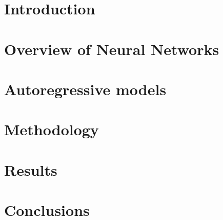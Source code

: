 \documentclass{thesis}
\begin{document}
\maketitle





\thesisTables
\thesisBodyStart

\chapter{Introduction}


\chapter{Overview of Neural Networks}


\chapter{Autoregressive models}


\chapter{Methodology}


\chapter{Results}


\chapter{Conclusions}


\printReferences
\thesisTOT
\thesisTOF
\end{document}
